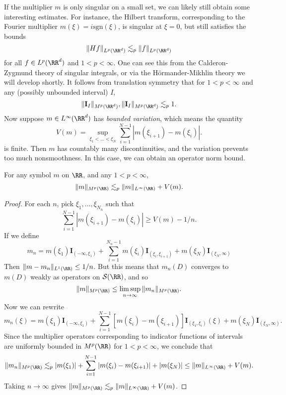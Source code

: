 If the multiplier $m$ is only singular on a small set, we can likely still obtain some interesting estimates. For instance, the Hilbert transform, corresponding to the Fourier multiplier $m(\xi) = i \text{sgn}(\xi)$, is singular at $\xi = 0$, but still satisfies the bounds
%
\[ \| Hf \|_{L^p(\RR^d)} \lesssim_p \| f \|_{L^p(\RR^d)} \]
%
for all $f \in L^p(\RR^d)$ and $1 < p < \infty$. One can see this from the Calderon-Zygmund theory of singular integrals, or via the H\"{o}rmander-Mikhlin theory we will develop shortly. It follows from translation symmetry that for $1 < p < \infty$ and any (possibly unbounded interval) $I$,
%
\[ \| \mathbf{I}_{I} \|_{M^p(\RR^d)}, \| \mathbf{I}_{I} \|_{M^p(\RR^d)} \lesssim_p 1. \]
%
Now suppose $m \in L^\infty(\RR^d)$ has \emph{bounded variation}, which means the quantity
%
\[ V(m) = \sup_{\xi_1 < \dots < \xi_N} \sum_{i = 1}^{N-1} |m(\xi_{i+1}) - m(\xi_i)|. \]
%
is finite. Then $m$ has countably many discontinuities, and the variation prevents too much nonsmoothness. In this case, we can obtain an operator norm bound.

\begin{theorem}
  For any symbol $m$ on $\RR$, and any $1 < p < \infty$,
  \[ \| m \|_{M^p(\RR)} \lesssim_p \| m \|_{L^\infty(\RR)} + V(m). \]
\end{theorem}
\begin{proof}
  For each $n$, pick $\xi_1,\dots,\xi_{N_n}$ such that
  \[ \sum_{i = 1}^{N-1} |m(\xi_{i+1}) - m(\xi_i)| \geq V(m) - 1/n. \]
  If we define
  \[ m_n = m(\xi_1) \mathbf{I}_{(-\infty,\xi_1)} + \sum_{i = 1}^{N_n-1} m(\xi_i) \mathbf{I}_{(\xi_i,\xi_{i+1})} + m(\xi_N) \mathbf{I}_{(\xi_N,\infty)} \]
  Then $\| m - m_n \|_{L^1(\RR)} \leq 1/n$. But this means that $m_n(D)$ converges to $m(D)$ weakly as operators on $\mathcal{S}(\RR)$, and so
  \[ \| m \|_{M^p(\RR)} \leq \limsup_{n \to \infty} \| m_n \|_{M^p(\RR)}. \]
  Now we can rewrite
  \[ m_n(\xi) = m(\xi_1) \mathbf{I}_{(-\infty,\xi_1)} + \sum_{i = 1}^{N-1} [m(\xi_i) - m(\xi_{i+1})] \mathbf{I}_{(\xi_1,\xi_i)}(\xi) + m(\xi_N) \mathbf{I}_{(\xi_N,\infty)}. \]
  Since the multiplier operators corresponding to indicator functions of intervals are uniformly bounded in $M^p(\RR)$ for $1 < p < \infty$, we conclude that
  \[ \| m_n \|_{M^p(\RR)} \lesssim_p |m(\xi_1)| + \sum_{i = 1}^{N-1} |m(\xi_i) - m(\xi_{i+1})| + |m(\xi_N)| \leq \| m \|_{L^\infty(\RR)} + V(m). \]
  Taking $n \to \infty$ gives $\| m \|_{M^p(\RR)} \lesssim_p \| m \|_{L^\infty(\RR)} + V(m)$.
\end{proof}

